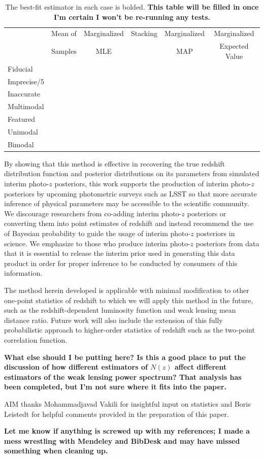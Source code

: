 \documentclass[preprint]{aastex}
\begin{document}
\begin{table}
\begin{tabular}{lccccc}
& Mean of & Marginalized & Stacking & Marginalized & Marginalized\\
& Samples & MLE & & MAP & Expected Value\\
Fiducial &&&&&\\
Imprecise/5 &&&&&\\
Inaccurate &&&&&\\
Multimodal &&&&&\\
Featured &&&&&\\
Unimodal &&&&&\\
Bimodal &&&&&
\end{tabular}
\caption{The best-fit estimator in each case is bolded.  \textbf{This table 
will be filled in once I'm certain I won't be re-running any tests.}}
\label{tab:kld}
\end{table}

By showing that this method is effective in recovering the true redshift 
distribution function and posterior distributions on its parameters from 
simulated interim photo-$z$ posteriors, this work supports the production of 
interim photo-$z$ posteriors by upcoming photometric surveys such as LSST so 
that more accurate inference of physical parameters may be accessible to the 
scientific community.  We discourage researchers from co-adding interim 
photo-$z$ posteriors or converting them into point estimates of redshift and 
instead recommend the use of Bayesian probability to guide the usage of interim 
photo-$z$ posteriors in science.  We emphasize to those who produce interim 
photo-$z$ posteriors from data that it is essential to release the interim 
prior used in generating this data product in order for proper inference to be 
conducted by consumers of this information.

The method herein developed is applicable with minimal modification to other 
one-point statistics of redshift to which we will apply this method in the 
future, such as the redshift-dependent luminosity function and weak lensing 
mean distance ratio.  Future work will also include the extension of this fully 
probabilistic approach to higher-order statistics of redshift such as the 
two-point correlation function.

\textbf{What else should I be putting here?  Is this a good place to put the 
discussion of how different estimators of $N(z)$ affect different estimators of 
the weak lensing power spectrum?  That analysis has been completed, but I'm not 
sure where it fits into the paper.}


\begin{acknowledgements}
AIM thanks Mohammadjavad Vakili for insightful input on statistics and Boris 
Leistedt for helpful comments provided in the preparation of this paper.
\end{acknowledgements}

\textbf{Let me know if anything is screwed up with my references; I made a mess 
wrestling with Mendeley and BibDesk and may have missed something when cleaning 
up.}


\end{document}
